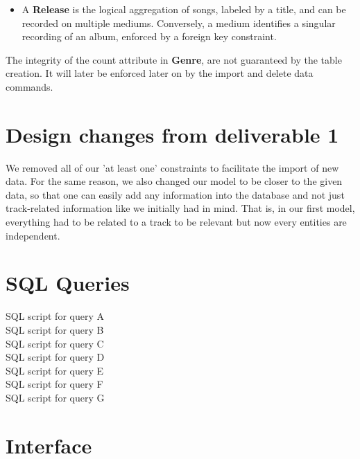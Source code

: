 \documentclass{article}
\begin{document}
{\begin{itemize}
  \item A \textbf{Release} is the logical aggregation of songs, labeled by a title, and can be recorded on multiple mediums. 
  Conversely, a medium identifies a singular recording of an album, enforced by a foreign key constraint.
\end{itemize}

The integrity of the count attribute in \textbf{Genre}, are not guaranteed by the table creation. It will
later be enforced later on by the import and delete data commands.

}

\section*{Design changes from deliverable 1}
We removed all of our 'at least one' constraints to facilitate the import of new data. For the same reason, we also changed our model to be closer to the given data, so that 
one can easily add any information into the database and not just track-related information like we initially had in mind. That is, in our first model, everything 
had to be related to a track to be relevant but now every entities are independent. 

\section*{SQL Queries}
{SQL script for query A} \\
{SQL script for query B} \\
{SQL script for query C} \\
{SQL script for query D} \\
{SQL script for query E} \\
{SQL script for query F} \\
{SQL script for query G} \\

\section*{Interface}
\end{document}
